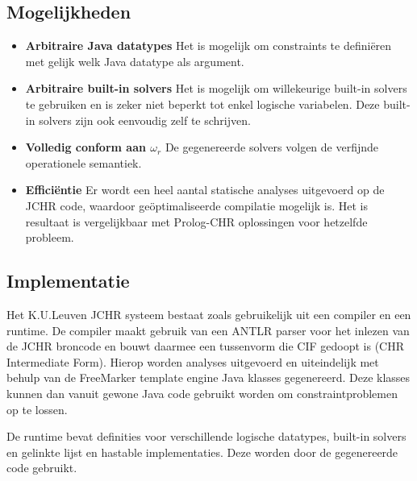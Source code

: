 \subsection{Mogelijkheden}

\begin{itemize}
\item {\bf Arbitraire Java datatypes} Het is mogelijk om constraints te defini\"eren met gelijk welk Java datatype als argument.
\item {\bf Arbitraire built-in solvers} Het is mogelijk om willekeurige built-in solvers te gebruiken en is zeker niet beperkt tot enkel logische variabelen. Deze built-in solvers zijn ook eenvoudig zelf te schrijven.
\item {\bf Volledig conform aan $\omega_r$} De gegenereerde solvers volgen de verfijnde operationele semantiek.
\item {\bf Effici\"entie} Er wordt een heel aantal statische analyses uitgevoerd op de JCHR code, waardoor ge\"optimaliseerde compilatie mogelijk is. Het is resultaat is vergelijkbaar met Prolog-CHR oplossingen voor hetzelfde probleem.
\end{itemize}

\subsection{Implementatie}

Het K.U.Leuven JCHR systeem bestaat zoals gebruikelijk uit een compiler en een runtime. De compiler maakt gebruik van een ANTLR parser voor het inlezen van de JCHR broncode en bouwt daarmee een tussenvorm die CIF gedoopt is (CHR Intermediate Form). Hierop worden analyses uitgevoerd en uiteindelijk met behulp van de FreeMarker template engine Java klasses gegenereerd. Deze klasses kunnen dan vanuit gewone Java code gebruikt worden om constraintproblemen op te lossen.

De runtime bevat definities voor verschillende logische datatypes, built-in solvers en gelinkte lijst en hastable implementaties. Deze worden door de gegenereerde code gebruikt.
